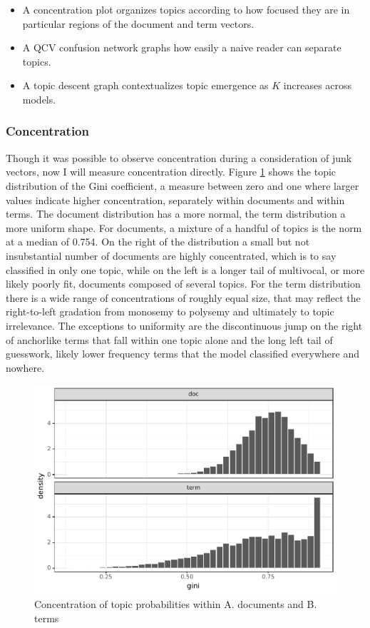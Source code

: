 \documentclass[]{book}
\providecommand{\tightlist}{%
  \setlength{\itemsep}{0pt}\setlength{\parskip}{0pt}}
\theoremstyle{definition}
\theoremstyle{definition}
\theoremstyle{definition}
\theoremstyle{remark}
\begin{document}
\begin{itemize}
\tightlist
\item
  A concentration plot organizes topics according to how focused they
  are in particular regions of the document and term vectors.
\item
  A QCV confusion network graphs how easily a naive reader can separate
  topics.
\item
  A topic descent graph contextualizes topic emergence as \(K\)
  increases across models.
\end{itemize}

\hypertarget{concentration}{%
\subsubsection{Concentration}\label{concentration}}

Though it was possible to observe concentration during a consideration
of junk vectors, now I will measure concentration directly. Figure
\ref{fig:doc-ginip} shows the topic distribution of the Gini
coefficient, a measure between zero and one where larger values indicate
higher concentration, separately within documents and within terms. The
document distribution has a more normal, the term distribution a more
uniform shape. For documents, a mixture of a handful of topics is the
norm at a median of 0.754. On the right of the distribution a small but
not insubstantial number of documents are highly concentrated, which is
to say classified in only one topic, while on the left is a longer tail
of multivocal, or more likely poorly fit, documents composed of several
topics. For the term distribution there is a wide range of
concentrations of roughly equal size, that may reflect the right-to-left
gradation from monosemy to polysemy and ultimately to topic irrelevance.
The exceptions to uniformity are the discontinuous jump on the right of
anchorlike terms that fall within one topic alone and the long left tail
of guesswork, likely lower frequency terms that the model classified
everywhere and nowhere.

\begin{figure}

{\centering \includegraphics[width=0.9\linewidth]{03_files/figure-latex/doc-ginip-1} 

}

\caption{Concentration of topic probabilities within A. documents and B. terms}\label{fig:doc-ginip}
\end{figure}
\end{document}

